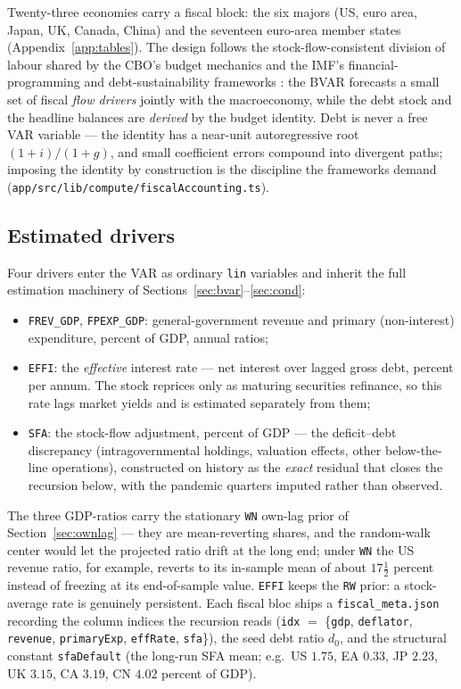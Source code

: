 \documentclass[11pt]{article}
\theoremstyle{plain}
\theoremstyle{remark}
\begin{document}
Twenty-three economies carry a fiscal block: the six majors (US, euro
area, Japan, UK, Canada, China) and the seventeen euro-area member
states (Appendix~\ref{app:tables}). The design follows the
stock-flow-consistent division of labour shared by the CBO's budget
mechanics and the IMF's financial-programming and debt-sustainability
frameworks \citep{Escolano2010, IMF2013DSA}: the BVAR forecasts a small
set of fiscal \emph{flow drivers} jointly with the macroeconomy, while
the debt stock and the headline balances are \emph{derived} by the
budget identity. Debt is never a free VAR variable --- the identity has
a near-unit autoregressive root $(1+i)/(1+g)$, and small coefficient
errors compound into divergent paths; imposing the identity by
construction is the discipline the frameworks demand
(\texttt{app/src/lib/compute/fiscalAccounting.ts}).

\subsection{Estimated drivers}\label{sec:drivers}

Four drivers enter the VAR as ordinary \texttt{lin} variables and
inherit the full estimation machinery of
Sections~\ref{sec:bvar}--\ref{sec:cond}:
\begin{itemize}
  \item \texttt{FREV\_GDP}, \texttt{FPEXP\_GDP}: general-government
    revenue and primary (non-interest) expenditure, percent of GDP,
    annual ratios;
  \item \texttt{EFFI}: the \emph{effective} interest rate --- net
    interest over lagged gross debt, percent per annum. The stock
    reprices only as maturing securities refinance, so this rate lags
    market yields and is estimated separately from them;
  \item \texttt{SFA}: the stock-flow adjustment, percent of GDP ---
    the deficit--debt discrepancy (intragovernmental holdings, valuation
    effects, other below-the-line operations), constructed on history as
    the \emph{exact} residual that closes the recursion below, with the
    pandemic quarters imputed rather than observed.
\end{itemize}
The three GDP-ratios carry the stationary \texttt{WN} own-lag prior of
Section~\ref{sec:ownlag} --- they are mean-reverting shares, and the
random-walk center would let the projected ratio drift at the long end;
under \texttt{WN} the US revenue ratio, for example, reverts to its
in-sample mean of about $17\tfrac12$ percent instead of freezing at its
end-of-sample value. \texttt{EFFI} keeps the \texttt{RW} prior: a
stock-average rate is genuinely persistent. Each fiscal bloc ships a
\texttt{fiscal\_meta.json} recording the column indices the recursion
reads (\texttt{idx} $=$ \{\texttt{gdp}, \texttt{deflator},
\texttt{revenue}, \texttt{primaryExp}, \texttt{effRate},
\texttt{sfa}\}), the seed debt ratio $d_0$, and the structural constant
\texttt{sfaDefault} (the long-run SFA mean; e.g.\ US $1.75$, EA $0.33$,
JP $2.23$, UK $3.15$, CA $3.19$, CN $4.02$ percent of GDP).
\end{document}
